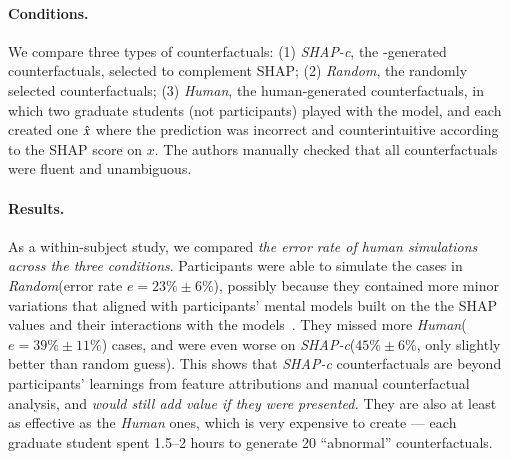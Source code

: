 \newcommand{\cshap}{\emph{SHAP-c}\xspace}
\newcommand{\crandom}{\emph{Random}\xspace}
\newcommand{\chuman}{\emph{Human}\xspace}
\paragraph{Conditions.} 
We compare three types of counterfactuals:
(1) \cshap, the \sysname-generated counterfactuals, selected to complement SHAP; 
(2) \crandom, the randomly selected \sysname counterfactuals; 
(3) \chuman, the human-generated counterfactuals, in which two graduate students (not participants) played with the model, and each created one $\hat{x}$ where the prediction was incorrect and counterintuitive according to the SHAP score on $x$.
The authors manually checked that all counterfactuals were fluent and unambiguous.

\paragraph{Results.}
As a within-subject study, we compared \emph{the error rate of human simulations across the three conditions}.
Participants were able to simulate the cases in \crandom (error rate $e=23\%\pm6\%$), possibly because they contained more minor variations that aligned with participants' mental models built on the the SHAP values and their interactions with the models~\cite{miller}.
They missed more \chuman ($e=39\%\pm11\%$) cases, and were even worse on \cshap ($45\%\pm 6\%$, only slightly better than random guess).%
This shows that \cshap counterfactuals are beyond participants' learnings from feature attributions and manual counterfactual analysis, and \emph{would still add value if they were presented.}
They are also at least as effective as the \chuman ones, which is very expensive to create --- each graduate student spent 1.5--2 hours to generate 20 ``abnormal'' counterfactuals.

